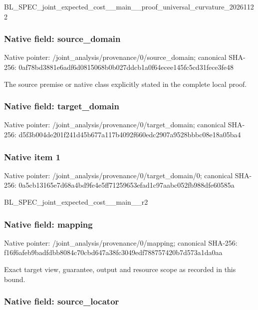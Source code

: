 \documentclass[10pt,a4paper]{article}
\begin{document}
BL\_SPEC\_joint\_expected\_c\allowbreak{}ost\_\_main\_\_proof\_univers\allowbreak{}al\_curvature\_20261122


\subsubsection{Native field: source\_domain}


Native pointer: /joint\_analysis/provenan\allowbreak{}ce/0/source\_domain; canonical SHA-256: 0af78bd3881e6adf6d081506\allowbreak{}8b0b027ddcb1a0f64ecee145\allowbreak{}fc5cd31fece3fe48


The source premise or native class explicitly stated in the complete local proof.


\subsubsection{Native field: target\_domain}


Native pointer: /joint\_analysis/provenan\allowbreak{}ce/0/target\_domain; canonical SHA-256: d5f3b004de201f241d45b677\allowbreak{}a117b4092f660edc2907a952\allowbreak{}8bbbc08e18a05ba4



\subsubsection{Native item 1}


Native pointer: /joint\_analysis/provenan\allowbreak{}ce/0/target\_domain/0; canonical SHA-256: 0a5cb13165e7d68a4bd9fe4e\allowbreak{}5ff71259653efad1c97aabc0\allowbreak{}52fb988dfe60585a


BL\_SPEC\_joint\_expected\_cost\_\_main\_\_r2


\subsubsection{Native field: mapping}


Native pointer: /joint\_analysis/provenance/0/mapping; canonical SHA-256: f16f6afeb9badfdbb8084c70\allowbreak{}cbd647a38fc3049edf788757\allowbreak{}420b7d573a1da0aa


Exact target view, guarantee, output and resource scope as recorded in this bound.


\subsubsection{Native field: source\_locator}
\end{document}

